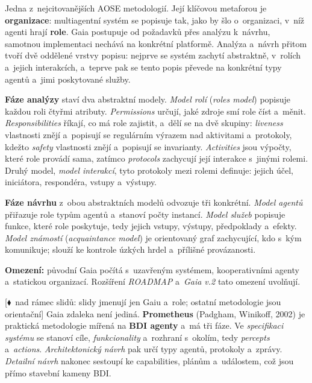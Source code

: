\documentclass[11pt,a4paper]{article}
\theoremstyle{definition}
\newcommand{\mimoq}[1]{\textcolor{markcol}{\textsf{\footnotesize[$\blacklozenge$~nad rámec slidů: #1]}}}
\begin{document}
\begin{defbox}
Jedna z~nejcitovanějších AOSE metodologií. Její klíčovou metaforou je \textbf{organizace}:
multiagentní systém se popisuje tak, jako by šlo o~organizaci, v~níž agenti hrají \textbf{role}.
Gaia postupuje od požadavků přes analýzu k~návrhu, samotnou implementaci nechává na konkrétní
platformě. Analýza a~návrh přitom tvoří dvě oddělené vrstvy popisu: nejprve se systém zachytí
abstraktně, v~rolích a~jejich interakcích, a~teprve pak se tento popis převede na konkrétní
typy agentů a~jimi poskytované služby.

\textbf{Fáze analýzy} staví dva abstraktní modely. \emph{Model rolí} (\emph{roles model})
popisuje každou roli čtyřmi atributy. \emph{Permissions} určují, jaké zdroje smí role číst
a~měnit. \emph{Responsibilities} říkají, co má role zajistit, a~dělí se na dvě skupiny:
\emph{liveness} vlastnosti znějí  a~popisují se regulárním výrazem
nad aktivitami a~protokoly, kdežto \emph{safety} vlastnosti znějí 
a~popisují se invarianty. \emph{Activities} jsou výpočty, které role provádí sama,
zatímco \emph{protocols} zachycují její interakce s~jinými rolemi. Druhý model, \emph{model
interakcí}, tyto protokoly mezi rolemi definuje: jejich účel, iniciátora, respondéra, vstupy
a~výstupy.

\textbf{Fáze návrhu} z~obou abstraktních modelů odvozuje tři konkrétní. \emph{Model agentů}
přiřazuje role typům agentů a~stanoví počty instancí. \emph{Model služeb} popisuje funkce,
které role poskytuje, tedy jejich vstupy, výstupy, předpoklady a~efekty. \emph{Model známostí}
(\emph{acquaintance model}) je orientovaný graf zachycující, kdo s~kým komunikuje; slouží ke
kontrole úzkých hrdel a~přílišné provázanosti.

\textbf{Omezení:} původní Gaia počítá s~uzavřeným systémem, kooperativními agenty a~statickou
organizací. Rozšíření \emph{ROADMAP} a~\emph{Gaia v.2} tato omezení uvolňují.
\end{defbox}

\noindent\mimoq{slidy jmenují jen Gaiu a~role; ostatní metodologie jsou orientační}
Gaia zdaleka není jediná. \textbf{Prometheus} (Padgham, Winikoff, 2002) je praktická
metodologie mířená na \textbf{BDI agenty} a~má tři fáze. Ve \emph{specifikaci systému} se
stanoví cíle, \emph{funkcionality} a~rozhraní s~okolím, tedy \emph{percepts} a~\emph{actions}.
\emph{Architektonický návrh} pak určí typy agentů, protokoly a~zprávy. \emph{Detailní návrh}
nakonec sestoupí ke capabilities, plánům a~událostem, což jsou přímo stavební kameny BDI.
\end{document}
